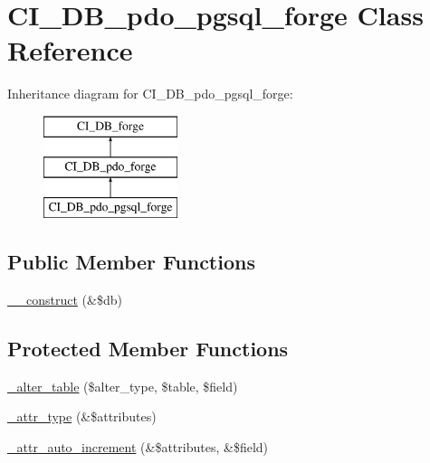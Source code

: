 \hypertarget{class_c_i___d_b__pdo__pgsql__forge}{}\section{C\+I\+\_\+\+D\+B\+\_\+pdo\+\_\+pgsql\+\_\+forge Class Reference}
\label{class_c_i___d_b__pdo__pgsql__forge}
Inheritance diagram for C\+I\+\_\+\+D\+B\+\_\+pdo\+\_\+pgsql\+\_\+forge\+:\begin{figure}[H]
\begin{center}
\leavevmode
\includegraphics[height=3.000000cm]{class_c_i___d_b__pdo__pgsql__forge}
\end{center}
\end{figure}
\subsection*{Public Member Functions}
\begin{DoxyCompactItemize}
\item 
\mbox{\hyperlink{class_c_i___d_b__pdo__pgsql__forge_aaf2ef772755ec6f361d44e16cc9ffd69}{\+\_\+\+\_\+construct}} (\&\$db)
\end{DoxyCompactItemize}
\subsection*{Protected Member Functions}
\begin{DoxyCompactItemize}
\item 
\mbox{\hyperlink{class_c_i___d_b__pdo__pgsql__forge_a41c6cae02f2fda8b429ad0afb9509426}{\+\_\+alter\+\_\+table}} (\$alter\+\_\+type, \$table, \$field)
\item 
\mbox{\hyperlink{class_c_i___d_b__pdo__pgsql__forge_a8553be952084c6f7cdfff370a1d14f6b}{\+\_\+attr\+\_\+type}} (\&\$attributes)
\item 
\mbox{\hyperlink{class_c_i___d_b__pdo__pgsql__forge_a2a013a5932439c3c44f0dad3436525f7}{\+\_\+attr\+\_\+auto\+\_\+increment}} (\&\$attributes, \&\$field)
\end{DoxyCompactItemize}
